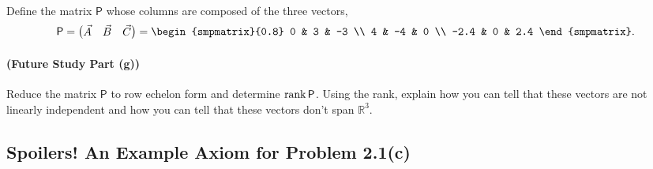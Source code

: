 \documentclass{article}
\begin{document}
\paragraph{}
Define the matrix $\mathsf{P}$ whose columns are composed of the three vectors,
	\begin{equation*}
		\mathsf{P} = \begin{pmatrix} \vec{A} & \vec{B} & \vec{C} \end{pmatrix} = \begin{smpmatrix}{0.8} 0 & 3 & -3 \\ 4 & -4 & 0 \\ -2.4 & 0 & 2.4 \end{smpmatrix}.
	\end{equation*}


\paragraph{(Future Study Part (g))}	\extrapart
Reduce the matrix $\mathsf{P}$ to row echelon form and determine $\rank{\mathsf{P}}$.
Using the rank, explain how you can tell that these vectors are not linearly independent and how you can tell that these vectors don't span $\mathbb{R}^{3}$.\\


\endofhomework

\bigskip
\dphline
\bigskip
\subsection*{Spoilers!  An Example Axiom for Problem 2.1(c)}
\end{document}
